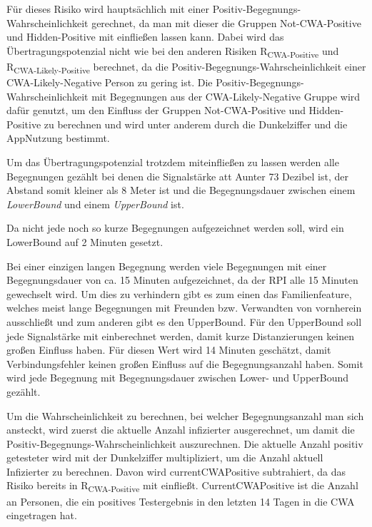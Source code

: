 \documentclass[conference,compsoc]{IEEEtran}
\begin{document}
Für dieses Risiko wird hauptsächlich mit einer Positiv-Begegnungs-Wahrscheinlichkeit gerechnet,
da man mit dieser die Gruppen Not-CWA-Positive und Hidden-Positive mit einfließen lassen kann.
Dabei wird das Übertragungspotenzial nicht wie bei den anderen Risiken R\textsubscript{CWA-Positive} und R\textsubscript{CWA-Likely-Positive} berechnet, 
da die Positiv-Begegnungs-Wahrscheinlichkeit einer CWA-Likely-Negative Person zu gering ist. 
Die Positiv-Begegnungs-Wahrscheinlichkeit mit Begegnungen aus der CWA-Likely-Negative Gruppe wird dafür genutzt,
um den Einfluss der Gruppen Not-CWA-Positive und Hidden-Positive zu berechnen und wird unter anderem durch die Dunkelziffer und die AppNutzung bestimmt.

Um das Übertragungspotenzial trotzdem miteinfließen zu lassen werden alle Begegnungen gezählt bei denen die Signalstärke att Aunter 73 Dezibel ist,
der Abstand somit kleiner als 8 Meter ist und die Begegnungsdauer zwischen einem \textit{LowerBound} und einem \textit{UpperBound} ist. 

Da nicht jede noch so kurze Begegnungen aufgezeichnet werden soll,
wird ein LowerBound auf 2 Minuten gesetzt. 

Bei einer einzigen langen Begegnung werden viele Begegnungen mit einer Begegnungsdauer von ca.
15 Minuten aufgezeichnet, da der RPI alle 15 Minuten gewechselt wird. 
Um dies zu verhindern gibt es zum einen das Familienfeature, 
welches meist lange Begegnungen mit Freunden bzw. Verwandten von vornherein ausschließt und zum anderen gibt es den UpperBound.
Für den UpperBound soll jede Signalstärke mit einberechnet werden, damit kurze Distanzierungen keinen großen Einfluss haben.
Für diesen Wert wird 14 Minuten geschätzt, damit Verbindungsfehler keinen großen Einfluss auf die Begegnungsanzahl haben.
Somit wird jede Begegnung mit Begegnungsdauer zwischen Lower- und UpperBound gezählt.

\centerline{\text{ }}



\text{\}}

\centerline{\text{ }}

Um die Wahrscheinlichkeit zu berechnen, bei welcher Begegnungsanzahl man sich ansteckt, wird zuerst die aktuelle Anzahl infizierter ausgerechnet, 
um damit die Positiv-Begegnungs-Wahrscheinlichkeit auszurechnen. 
Die aktuelle Anzahl positiv getesteter wird mit der Dunkelziffer multipliziert, um die Anzahl aktuell Infizierter zu berechnen. 
Davon wird {currentCWAPositive} subtrahiert, da das Risiko bereits in R\textsubscript{CWA-Positive} mit einfließt. 
CurrentCWAPositive ist die Anzahl an Personen, die ein positives Testergebnis in den letzten 14 Tagen in die CWA eingetragen hat.
\end{document}
